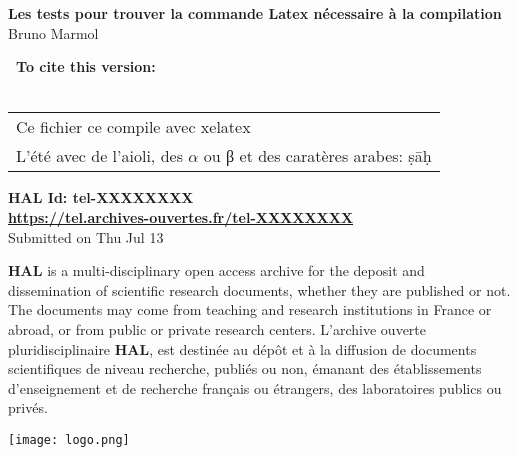 \documentclass[11pt,a4paper]{article}
\begin{document}
\vspace*{\fill}
\begin{center}
\vspace*{2cm}
\begin{doublespace}
{\LARGE \textbf{Les tests pour trouver la commande Latex nécessaire à la compilation}} \\
{\Large Bruno Marmol}
\end{doublespace}
\end{center}
{\Large \textbf{~To cite this version:}} \\\\
\begin{tabular}{|p{\textwidth}}
{\large Ce fichier ce compile avec xelatex} \\
{\large L'été avec de l'aioli, des $\alpha$ ou β et des caratères arabes: ṣāḥ } \\
\end{tabular}
\vspace*{1cm}
\begin{center}
\begin{doublespace}
{\Large \textbf{HAL Id: tel-XXXXXXXX}} \\
{\Large \textbf{\url{https://tel.archives-ouvertes.fr/tel-XXXXXXXX}}} \\
Submitted on Thu Jul 13 
\end{doublespace}
\end{center}
\vspace*{1cm}
\begin{multicols}{2}
\textbf{HAL} is a multi-disciplinary open access archive for the deposit and dissemination of scientific research documents, whether they are published or not. The documents may come from teaching and research institutions in France or abroad, or from public or private research centers.
\vfill
\columnbreak
L'archive ouverte pluridisciplinaire \textbf{HAL}, est destinée au dépôt et à la diffusion de documents scientifiques de niveau recherche, publiés ou non, émanant des établissements d'enseignement et de recherche français ou étrangers, des laboratoires publics ou privés.
\end{multicols}
\texttt{[image: logo.png]}
\vspace{1cm}
\begin{center}
\end{center}
\vspace*{\fill}
\end{document}

